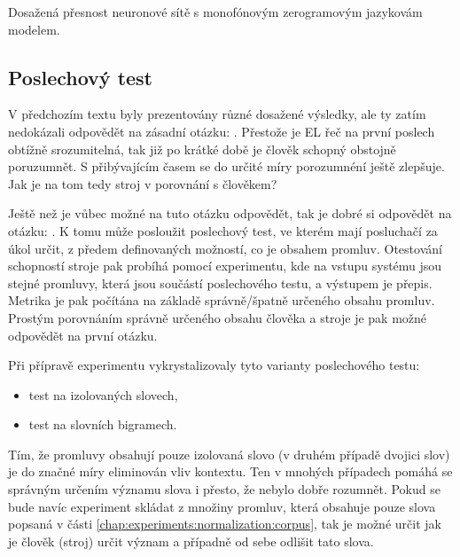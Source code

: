 \begin{table}[htpb]
  \centering
  \def\arraystretch{1.5}
  \caption{Dosažená přesnost neuronové sítě s monofónovým zerogramovým jazykovám modelem.}
  \label{tab:experiments:normalization:dnn}
\end{table}

\subsection{Poslechový test}
\label{chap:experiments:normalization:listening}

V předchozím textu byly prezentovány různé dosažené výsledky, ale ty zatím nedokázali odpovědět na zásadní otázku: . Přestože je EL řeč na první poslech obtížně srozumitelná, tak již po krátké době je člověk schopný obstojně poruzumnět. S přibývajícím časem se do určité míry porozumnéní ještě zlepšuje. Jak je na tom tedy stroj v porovnání s člověkem?

Ještě než je vůbec možné na tuto otázku odpovědět, tak je dobré si odpovědět na otázku: . K tomu může posloužit poslechový test, ve kterém mají posluchačí za úkol určit, z předem definovaných možností, co je obsahem promluv. Otestování schopností stroje pak probíhá pomocí experimentu, kde na vstupu systému jsou stejné promluvy, která jsou součástí poslechového testu, a výstupem je přepis. Metrika je pak počítána na základě správně/špatně určeného obsahu promluv. Prostým porovnáním správně určeného obsahu člověka a stroje je pak možné odpovědět na první  otázku.

Při přípravě experimentu vykrystalizovaly tyto varianty poslechového testu:

\begin{itemize}
  \item test na izolovaných slovech,
  \item test na slovních bigramech.
\end{itemize}

\noindent Tím, že promluvy obsahují pouze izolovaná slovo (v druhém případě dvojici slov) je do značné míry eliminován vliv kontextu. Ten v mnohých případech pomáhá se správným určením významu slova i přesto, že nebylo dobře rozumnět. Pokud se bude navíc experiment skládat z množiny promluv, která obsahuje pouze slova popsaná v části \ref{chap:experiments:normalization:corpus}, tak je možné  určit jak  je člověk (stroj) určit význam a případně od sebe odlišit tato slova.

